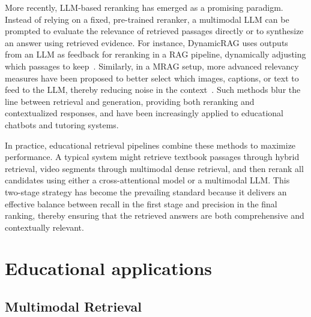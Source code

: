 More recently, LLM-based reranking has emerged as a promising paradigm. Instead of relying on a fixed, pre-trained reranker, a multimodal LLM can be prompted to evaluate the relevance of retrieved passages directly or to synthesize an answer using retrieved evidence. For instance, DynamicRAG uses outputs from an LLM as feedback for reranking in a RAG pipeline, dynamically adjusting which passages to keep~\cite{sun2025dynamicrag}. Similarly, in a MRAG setup, more advanced relevancy measures have been proposed to better select which images, captions, or text to feed to the LLM, thereby reducing noise in the context~\cite{mortaheb2025reranking}. Such methods blur the line between retrieval and generation, providing both reranking and contextualized responses, and have been increasingly applied to educational chatbots and tutoring systems.

In practice, educational retrieval pipelines combine these methods to maximize performance. A typical system might retrieve textbook passages through hybrid retrieval, video segments through multimodal dense retrieval, and then rerank all candidates using either a cross-attentional model or a multimodal LLM. This two-stage strategy has become the prevailing standard because it delivers an effective balance between recall in the first stage and precision in the final ranking, thereby ensuring that the retrieved answers are both comprehensive and contextually relevant.


\section{Educational applications}

\subsection{Multimodal Retrieval}

